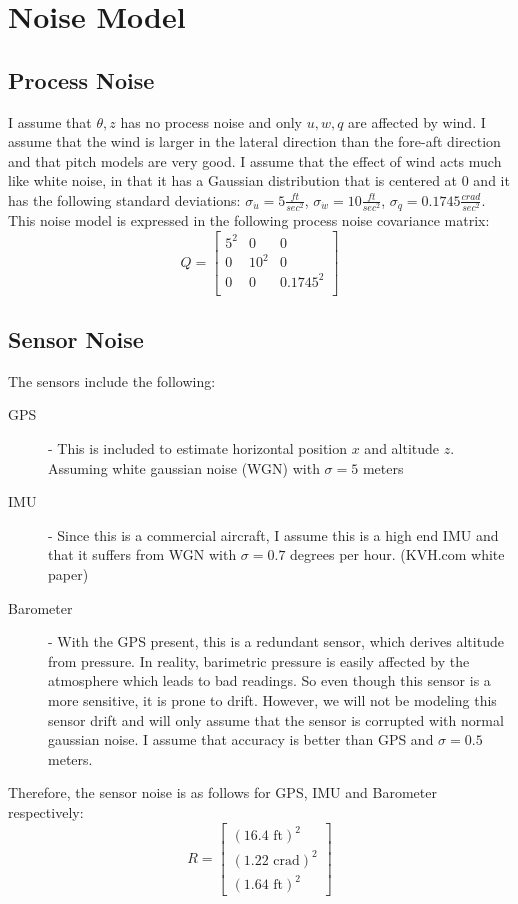 \section{Noise Model} \label{sec:noise}

\subsection{Process Noise}

I assume that $\theta, z$ has no process noise and only $u, w, q$ are affected
by wind. I assume that the wind is larger in the lateral direction
than the fore-aft direction and that pitch models are very good. I
assume that the effect of wind acts much like white noise, in that
it has a Gaussian distribution that is centered at 0 and it has the
following standard deviations: $\sigma_{\dot u} = 5 \frac{ft}{sec^2}$,
$\sigma_{\dot w} = 10 \frac{ft}{sec^2}$, $\sigma_{\dot q} = 0.1745
\frac{crad}{sec^2}$. This noise model is expressed in the following
process noise covariance matrix:
\begin{equation} \label{eq:processnoise}
Q =
\begin{bmatrix}
  5^2 & 0 & 0\\
  0 & 10^2 & 0\\
  0 & 0 & 0.1745^2\\
\end{bmatrix} 
\end{equation}

\subsection{Sensor Noise}

The sensors include the following:
\begin{description}
\item [GPS] - This is included to estimate horizontal position $x$ and
  altitude $z$. Assuming white gaussian noise (WGN) with $\sigma = 5$ meters
  \cite{zaliva2014}
\item [IMU] - Since this is a commercial aircraft, I assume this is a
  high end IMU and that it suffers from WGN with $\sigma = 0.7$
  degrees per hour. (KVH.com white paper)
\item [Barometer] - With the GPS present, this is a redundant sensor,
  which derives altitude from pressure. In reality, barimetric pressure
  is easily affected by the atmosphere which leads to bad
  readings. So even though this sensor is a more sensitive, it is
  prone to drift. However, we will not be modeling this sensor drift
  and will only assume that the sensor is corrupted with normal
  gaussian noise. I assume that accuracy is better than GPS and
  $\sigma = 0.5$ meters. \cite{zaliva2014}
\end{description}

Therefore, the sensor noise is as follows for GPS, IMU and Barometer respectively:
\begin{equation} \label{eq:sensornoise}
R =
\begin{bmatrix}
  (16.4 \text{ ft})^2 \\
  (1.22 \text{ crad})^2 \\
  (1.64 \text{ ft})^2
\end{bmatrix} 
\end{equation}
